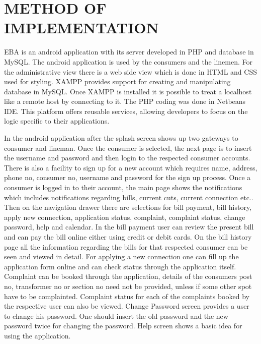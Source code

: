 \documentclass[12pt,a4paper,oneside]{report}
\begin{document}
 \section{METHOD OF IMPLEMENTATION}
 \par EBA is an android application with its server developed in PHP and database in MySQL. The android application is used by the consumers and the linemen. For the administrative view there is a web side view which is done in HTML and CSS used for styling. XAMPP provides support for creating and manipulating database in MySQL. Once XAMPP is installed it is possible to treat a localhost like a remote host by connecting to it. The PHP coding was done in Netbeans IDE. This platform offers reusable services, allowing developers to focus on the logic specific to their applications. 
 \par In the android application after the splash screen shows up two gateways to consumer and lineman. Once the consumer is selected, the next page is to insert the username and password and then login to the respected consumer accounts. There is also a facility to sign up for a new account which requires name, address, phone no, consumer no, username and password for the sign up process. Once a consumer is logged in to their account, the main page shows the notifications which includes notifications regarding bills, current cuts, current connection etc.. Then on the navigation drawer there are selections for bill payment, bill history, apply new connection, application status, complaint, complaint status, change password, help and calendar.
 In the bill payment user can review the present bill and can pay the bill online either using credit or debit cards. On the bill history page all the information regarding the bills for that respected consumer can be seen and viewed in detail. For applying a new connection one can fill up the application form online and can check status through the application itself. Complaint can be booked through the application, details of the consumers post no, transformer no or section no need not be provided, unless if some other spot have to be complainted. Complaint status for each of the complaints booked by the respective user can also be viewed. Change Password screen provides a user to change his password. One should insert the old password and the new password twice for changing the password. Help screen shows a basic idea for using the application.
\end{document}
